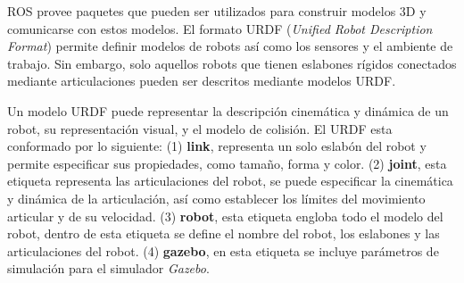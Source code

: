 ROS provee paquetes que pueden ser utilizados para construir modelos 3D y comunicarse 
con estos modelos. El formato URDF (\textit{Unified Robot Description Format}) permite 
definir modelos de robots así como los sensores y el ambiente de trabajo. Sin embargo, solo 
aquellos robots que tienen eslabones rígidos conectados mediante articulaciones pueden ser 
descritos mediante modelos URDF.

Un modelo URDF puede representar la descripción cinemática y dinámica de un robot, su 
representación visual, y el modelo de colisión. El URDF esta conformado por lo siguiente: 
(1) \textbf{link}, representa un solo eslabón del robot y permite especificar sus propiedades, 
como tamaño, forma y color. (2) \textbf{joint}, esta etiqueta representa las articulaciones del 
robot, se puede especificar la cinemática y dinámica de la articulación, así como establecer 
los límites del movimiento articular y de su velocidad. (3) \textbf{robot}, esta etiqueta 
engloba todo el modelo del robot, dentro de esta etiqueta se define el nombre del robot, los 
eslabones y las articulaciones del robot. (4) \textbf{gazebo}, en esta etiqueta se incluye 
parámetros de simulación para el simulador \textit{Gazebo}.




